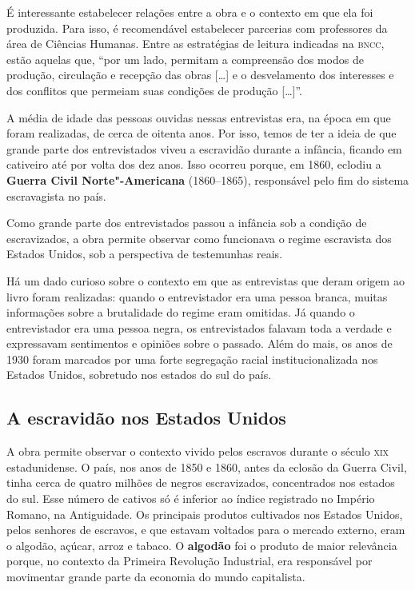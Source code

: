 \documentclass[11pt]{extarticle}
\begin{document}




É interessante estabelecer relações entre a obra e o contexto em que ela
foi produzida. Para isso, é recomendável estabelecer parcerias com
professores da área de Ciências Humanas. Entre as estratégias de leitura
indicadas na \textsc{bncc}, estão aquelas que, ``por um lado, permitam a
compreensão dos modos de produção, circulação e recepção das obras
{[}\ldots{}{]} e o desvelamento dos interesses e dos conflitos que permeiam
suas condições de produção {[}\ldots{}{]}''.

A média de idade das pessoas ouvidas nessas entrevistas era, na época em
que foram realizadas, de cerca de oitenta anos. Por isso, temos de ter a
ideia de que grande parte dos entrevistados viveu a escravidão durante a
infância, ficando em cativeiro até por volta dos dez anos. Isso ocorreu
porque, em 1860, eclodiu a \textbf{Guerra Civil Norte"-Americana}
(1860--1865), responsável pelo fim do sistema escravagista no país.

Como grande parte dos entrevistados passou a infância sob a condição de
escravizados, a obra permite observar como funcionava o regime
escravista dos Estados Unidos, sob a perspectiva de testemunhas reais.






Há um dado curioso sobre o contexto em que as entrevistas que deram
origem ao livro foram realizadas: quando o entrevistador era uma pessoa
branca, muitas informações sobre a brutalidade do regime eram omitidas.
Já quando o entrevistador era uma pessoa negra, os entrevistados falavam
toda a verdade e expressavam sentimentos e opiniões sobre o passado.
Além do mais, os anos de 1930 foram marcados por uma forte segregação
racial institucionalizada nos Estados Unidos, sobretudo nos estados do
sul do país.

\subsection{A escravidão nos Estados Unidos}

A obra permite observar o contexto vivido pelos escravos durante o
século \textsc{xix} estadunidense. O país, nos anos de 1850 e 1860, antes da
eclosão da Guerra Civil, tinha cerca de quatro milhões de negros
escravizados, concentrados nos estados do sul. Esse número de cativos só
é inferior ao índice registrado no Império Romano, na Antiguidade. Os
principais produtos cultivados nos Estados Unidos, pelos senhores de
escravos, e que estavam voltados para o mercado externo, eram o algodão,
açúcar, arroz e tabaco. O \textbf{algodão} foi o produto de maior
relevância porque, no contexto da Primeira Revolução Industrial, era
responsável por movimentar grande parte da economia do mundo
capitalista.
\end{document}

